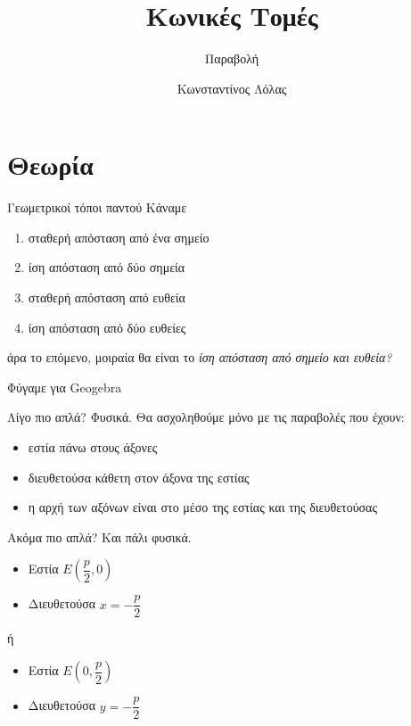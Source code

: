 \documentclass{presentation}
\title{Κωνικές Τομές}
\subtitle{Παραβολή}
\author[Λόλας]{Κωνσταντίνος Λόλας}
\date{}
\begin{document}
\begin{frame}
  \titlepage
\end{frame}

\section{Θεωρία}
\begin{frame}{Γεωμετρικοί τόποι παντού}
  Κάναμε
  \begin{enumerate}
    \item<1-> σταθερή απόσταση από ένα σημείο
    \item<2-> ίση απόσταση από δύο σημεία
    \item<3-> σταθερή απόσταση από ευθεία
    \item<4-> ίση απόσταση από δύο ευθείες
  \end{enumerate}
   {άρα το επόμενο, μοιραία θα είναι το}  {\emph{ίση απόσταση από σημείο και ευθεία?}}
\end{frame}

\begin{frame}{Φύγαμε για Geogebra}
  \href{https://www.geogebra.org/classic/wfmc8s24}{}
\end{frame}

\begin{frame}{Λίγο πιο απλά?}
  Φυσικά. Θα ασχοληθούμε μόνο με τις παραβολές που έχουν:
  \begin{itemize}
    \item εστία πάνω στους άξονες
    \item διευθετούσα κάθετη στον άξονα της εστίας
    \item η αρχή των αξόνων είναι στο μέσο της εστίας και της διευθετούσας
  \end{itemize}
\end{frame}

\begin{frame}{Ακόμα πιο απλά?}
  Και πάλι φυσικά.
  \begin{itemize}
    \item Εστία $Ε(\dfrac{p}{2},0)$
    \item Διευθετούσα $x=-\dfrac{p}{2}$
  \end{itemize}
  ή
  \begin{itemize}
    \item Εστία $Ε(0,\dfrac{p}{2})$
    \item Διευθετούσα $y=-\dfrac{p}{2}$
  \end{itemize}
\end{frame}
\end{document}
